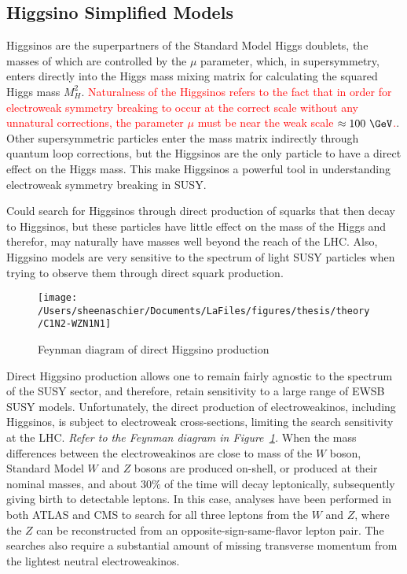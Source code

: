 \subsection{Higgsino Simplified Models}
Higgsinos are the superpartners of the Standard Model Higgs doublets, the masses of which are controlled by the $\mu$ parameter, which, in supersymmetry, enters directly into the Higgs mass mixing matrix for calculating the squared Higgs mass $M_H^2$. \cite{han}  \textcolor{red}{Naturalness of the Higgsinos refers to the fact that in order for electroweak symmetry breaking to occur at the correct scale without any unnatural corrections, the parameter $\mu$ must be near the weak scale $\approx 100~\GeV$.}. Other supersymmetric particles enter the mass matrix indirectly through quantum loop corrections, but the Higgsinos are the only particle to have a direct effect on the Higgs mass.  This make Higgsinos a powerful tool in understanding electroweak symmetry breaking in SUSY.

Could search for Higgsinos through direct production of squarks that then decay to Higgsinos, but these particles have little effect on the mass of the Higgs and therefor, may naturally have masses well beyond the reach of the LHC.  Also, Higgsino models are very sensitive to the spectrum of light SUSY particles when trying to observe them through direct squark production.

 \begin{figure}%
  \begin{center}
  \texttt{[image: /Users/sheenaschier/Documents/LaFiles/figures/thesis/theory/C1N2-WZN1N1]}
   \end{center}
 \caption{Feynman diagram of direct Higgsino production}
 \label{fig:fn1}
 \end{figure}
 
Direct Higgsino production allows one to remain fairly agnostic to the spectrum of the SUSY sector, and therefore, retain sensitivity to a large range of EWSB SUSY models.  Unfortunately, the direct production of electroweakinos, including Higgsinos, is subject to electroweak cross-sections, limiting the search sensitivity at the LHC.  \textit{Refer to the Feynman diagram in Figure~\ref{fig:fn1}.}  When the mass differences between the electroweakinos are close to mass of the $W$ boson, Standard Model $W$ and $Z$ bosons are produced on-shell, or produced at their nominal masses, and about $30\%$ of the time will decay leptonically, subsequently giving birth to detectable leptons.  In this case, analyses have been performed in both ATLAS and CMS to search for all three leptons from the $W$ and $Z$, where the $Z$ can be reconstructed from an opposite-sign-same-flavor lepton pair.  The searches also require a substantial amount of missing transverse momentum from the lightest neutral electroweakinos.

